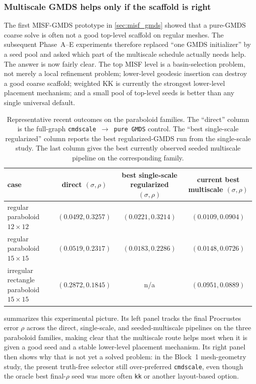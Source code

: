 \documentclass[11pt]{article}
\begin{document}
\subsubsection*{Multiscale GMDS helps only if the scaffold is right}
The first MISF-GMDS prototype in \cref{sec:misf_gmds} showed that a pure-GMDS
coarse solve is often not a good top-level scaffold on regular meshes.  The
subsequent Phase~A--E experiments therefore replaced ``one GMDS initializer''
by a seed pool and asked which part of the multiscale schedule actually needs
help.  The answer is now fairly clear.  The top MISF level is a
basin-selection problem, not merely a local refinement problem; lower-level
geodesic insertion can destroy a good coarse scaffold; weighted KK is
currently the strongest lower-level placement mechanism; and a small pool of
top-level seeds is better than any single universal default.

\begin{table}[t]
  \centering
  \small
  \caption{Representative recent outcomes on the paraboloid families.  The
  ``direct'' column is the full-graph \texttt{cmdscale $\rightarrow$ pure GMDS}
  control.  The ``best single-scale regularized'' column reports the best
  regularized-GMDS run from the single-scale study.  The last column gives the
  best currently observed seeded multiscale pipeline on the corresponding
  family.}
  \label{tab:recent_paraboloid_results}
  \begin{tabular}{lccc}
    \toprule
    case & direct $(\sigma,\rho)$ & best single-scale regularized $(\sigma,\rho)$ & current best multiscale $(\sigma,\rho)$ \\
    \midrule
    regular paraboloid $12\times 12$ & $(0.0492, 0.3257)$ & $(0.0221, 0.3214)$ & $(0.0109, 0.0904)$ \\
    regular paraboloid $15\times 15$ & $(0.0519, 0.2317)$ & $(0.0183, 0.2286)$ & $(0.0148, 0.0726)$ \\
    irregular rectangle paraboloid $15\times 15$ & $(0.2872, 0.1845)$ & n/a & $(0.0951, 0.0889)$ \\
    \bottomrule
  \end{tabular}
\end{table}

 summarizes this experimental picture.
Its left panel tracks the final Procrustes error $\rho$ across the direct,
single-scale, and seeded-multiscale pipelines on the three paraboloid
families, making clear that the multiscale route helps most when it is given a
good seed and a stable lower-level placement mechanism.  Its right panel then
shows why that is not yet a solved problem: in the Block~1 mesh-geometry study,
the present truth-free selector still over-preferred \texttt{cmdscale}, even
though the oracle best final-$\rho$ seed was more often \texttt{kk} or another
layout-based option.
\end{document}
